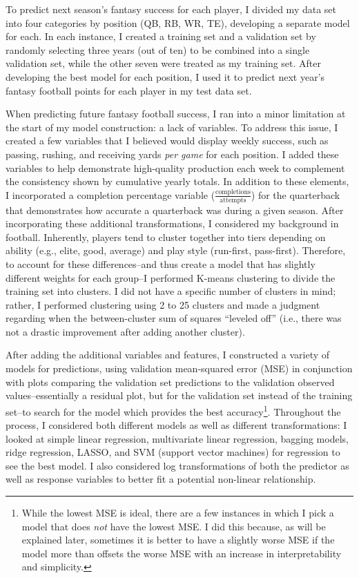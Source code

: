 \documentclass[
]{article}
\begin{document}
To predict next season's fantasy success for each player, I divided my
data set into four categories by position (QB, RB, WR, TE), developing a
separate model for each. In each instance, I created a training set and
a validation set by randomly selecting three years (out of ten) to be
combined into a single validation set, while the other seven were
treated as my training set. After developing the best model for each
position, I used it to predict next year's fantasy football points for
each player in my test data set.

When predicting future fantasy football success, I ran into a minor
limitation at the start of my model construction: a lack of variables.
To address this issue, I created a few variables that I believed would
display weekly success, such as passing, rushing, and receiving yards
\emph{per game} for each position. I added these variables to help
demonstrate high-quality production each week to complement the
consistency shown by cumulative yearly totals. In addition to these
elements, I incorporated a completion percentage variable
(\(\frac{\text{completions}}{\text{attempts}}\)) for the quarterback
that demonstrates how accurate a quarterback was during a given season.
After incorporating these additional transformations, I considered my
background in football. Inherently, players tend to cluster together
into tiers depending on ability (e.g., elite, good, average) and play
style (run-first, pass-first). Therefore, to account for these
differences--and thus create a model that has slightly different weights
for each group--I performed K-means clustering to divide the training
set into clusters. I did not have a specific number of clusters in mind;
rather, I performed clustering using 2 to 25 clusters and made a
judgment regarding when the between-cluster sum of squares ``leveled
off'' (i.e., there was not a drastic improvement after adding another
cluster).

After adding the additional variables and features, I constructed a
variety of models for predictions, using validation mean-squared error
(MSE) in conjunction with plots comparing the validation set predictions
to the validation observed values--essentially a residual plot, but for
the validation set instead of the training set--to search for the model
which provides the best accuracy\footnote{While the lowest MSE is ideal,
  there are a few instances in which I pick a model that does \emph{not}
  have the lowest MSE. I did this because, as will be explained later,
  sometimes it is better to have a slightly worse MSE if the model more
  than offsets the worse MSE with an increase in interpretability and
  simplicity.}. Throughout the process, I considered both different
models as well as different transformations: I looked at simple linear
regression, multivariate linear regression, bagging models, ridge
regression, LASSO, and SVM (support vector machines) for regression to
see the best model. I also considered log transformations of both the
predictor as well as response variables to better fit a potential
non-linear relationship.
\end{document}
